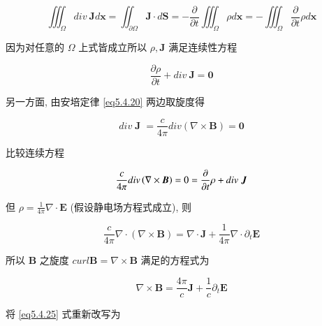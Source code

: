 \documentclass[11pt]{article}
\begin{document}
\begin{equation}
\iiint_\Omega  {div \ \boldsymbol{J}d\boldsymbol{x} = \iint_{\partial \Omega } {\boldsymbol{J} \cdot d\boldsymbol{S}}} =  - \frac{\partial }{{\partial t}}\iiint_\Omega  {\rho d\boldsymbol{x}} =  - \iiint_\Omega  {\frac{\partial }{{\partial t}}\rho d\boldsymbol{x}}
\label{eq5.4.26}
\end{equation}

因为对任意的 $ \Omega $ 上式皆成立所以 $ \rho, \boldsymbol{J} $ 满足连续性方程

\begin{equation}
\frac{{\partial \rho }}{{\partial t}} + div \ \boldsymbol{J} = \boldsymbol{0}
\label{eq5.4.27}
\end{equation}

另一方面, 由安培定律 \ref{eq5.4.20} 两边取旋度得

\begin{equation}
div\;\boldsymbol{J}\; = \frac{c}{{4\pi }}div\left( {\nabla  \times \boldsymbol{B}} \right) = \boldsymbol{0}
\label{eq5.4.28}
\end{equation}

比较连续方程

\begin{equation}
\frac{c}{{4\pi }}div\left( {\nabla  \times \boldsymbol{B}} \right) = 0 = \frac{\partial }{{\partial t}}\rho  + div\;\boldsymbol{J}
\notag 
\end{equation}

但 $\rho  = \frac{1}{{4\pi }}\nabla  \cdot \boldsymbol{E}$ (假设静电场方程式成立), 则

\begin{equation}
\frac{c}{{4\pi }}\nabla  \cdot \left( {\nabla  \times \boldsymbol{B}} \right) = \nabla  \cdot \boldsymbol{J} + \frac{1}{{4\pi }}\nabla  \cdot {\partial _t}\boldsymbol{E}
\label{eq5.4.29}
\end{equation}

所以 $ \boldsymbol{B} $ 之旋度 $ curl \boldsymbol{B} = \nabla \times \boldsymbol{B} $ 满足的方程式为

\begin{equation}
\nabla  \times \boldsymbol{B} = \frac{{4\pi }}{c}\boldsymbol{J} + \frac{1}{c}{\partial _t}\boldsymbol{E}
\label{eq5.4.30}
\end{equation}

将 \ref{eq5.4.25} 式重新改写为
\end{document}
